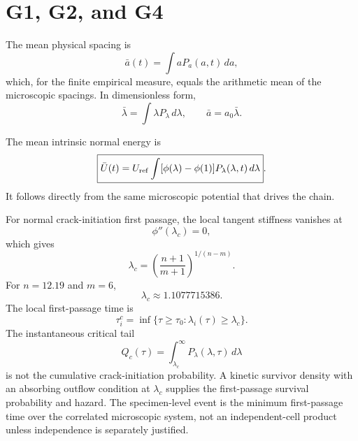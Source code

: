 \documentclass[11pt]{article}
\begin{document}
\section{G1, G2, and G4}
The mean physical spacing is
\begin{equation}
\boxed{\bar a(t)=\int aP_a(a,t)\,da},
\end{equation}
which, for the finite empirical measure, equals the arithmetic mean of the microscopic spacings. In dimensionless form,
\begin{equation}
\bar\lambda=\int\lambda P_\lambda\,d\lambda,
\qquad \bar a=a_0\bar\lambda.
\end{equation}

The mean intrinsic normal energy is
\begin{equation}
\boxed{
\bar U(t)=U_{\rm ref}\int[\phi(\lambda)-\phi(1)]P_\lambda(\lambda,t)\,d\lambda
}.
\end{equation}
It follows directly from the same microscopic potential that drives the chain.

For normal crack-initiation first passage, the local tangent stiffness vanishes at
\begin{equation}
\phi''(\lambda_c)=0,
\end{equation}
which gives
\begin{equation}
\boxed{
\lambda_c=\left(\frac{n+1}{m+1}\right)^{1/(n-m)}
}.
\end{equation}
For \(n=12.19\) and \(m=6\),
\begin{equation}
\lambda_c\approx1.1077715386.
\end{equation}
The local first-passage time is
\begin{equation}
\tau_i^c=\inf\{\tau\ge\tau_0:\lambda_i(\tau)\ge\lambda_c\}.
\end{equation}
The instantaneous critical tail
\begin{equation}
Q_c(\tau)=\int_{\lambda_c}^{\infty}P_\lambda(\lambda,\tau)\,d\lambda
\end{equation}
is not the cumulative crack-initiation probability. A kinetic survivor density with an absorbing outflow condition at \(\lambda_c\) supplies the first-passage survival probability and hazard. The specimen-level event is the minimum first-passage time over the correlated microscopic system, not an independent-cell product unless independence is separately justified.
\end{document}
